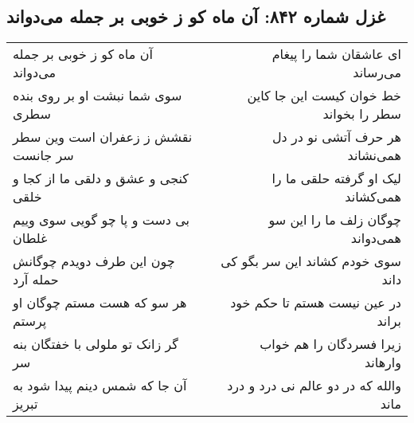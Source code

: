 \begin{center}
\section*{غزل شماره ۸۴۲: آن ماه کو ز خوبی بر جمله می‌دواند}
\label{sec:0842}
\begin{longtable}{l p{0.5cm} r}
آن ماه کو ز خوبی بر جمله می‌دواند
&&
ای عاشقان شما را پیغام می‌رساند
\\
سوی شما نبشت او بر روی بنده سطری
&&
خط خوان کیست این جا کاین سطر را بخواند
\\
نقشش ز زعفران است وین سطر سر جانست
&&
هر حرف آتشی نو در دل همی‌نشاند
\\
کنجی و عشق و دلقی ما از کجا و خلقی
&&
لیک او گرفته حلقی ما را همی‌کشاند
\\
بی دست و پا چو گویی سوی وییم غلطان
&&
چوگان زلف ما را این سو همی‌دواند
\\
چون این طرف دویدم چوگانش حمله آرد
&&
سوی خودم کشاند این سر بگو کی داند
\\
هر سو که هست مستم چوگان او پرستم
&&
در عین نیست هستم تا حکم خود براند
\\
گر زانک تو ملولی با خفتگان بنه سر
&&
زیرا فسردگان را هم خواب وارهاند
\\
آن جا که شمس دینم پیدا شود به تبریز
&&
والله که در دو عالم نی درد و درد ماند
\\
\end{longtable}
\end{center}
